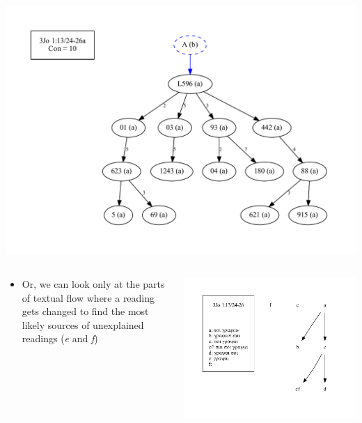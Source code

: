 \documentclass[10pt]{beamer}
\begin{document}
	\begin{frame}
		\begin{center}
			\includegraphics[width=\textwidth]{../img/B25K1V13U24-26Ra-coherence-attestations-b-initial.pdf}
		\end{center}
	\end{frame}
	\begin{frame}
		\begin{columns}
			\begin{column}{0.45\textwidth}
				\begin{itemize}
					\item Or, we can look only at the parts of textual flow where a reading gets changed to find the most likely sources of unexplained readings (\emph{e} and \emph{f})
				\end{itemize}
			\end{column}
			\begin{column}{0.45\textwidth}
				\begin{center}
					\includegraphics[width=\textwidth]{../img/B25K1V13U24-26-local-stemma-incomplete.pdf}
				\end{center}
			\end{column}
		\end{columns}
	\end{frame}
\end{document}
